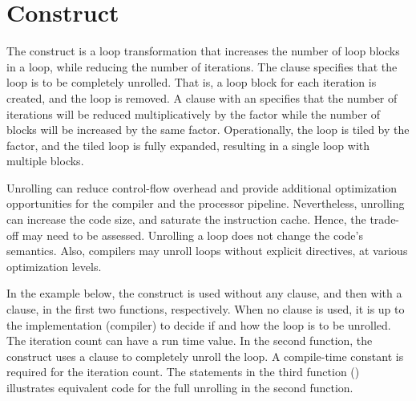 \pagebreak
\section{ Construct}
\label{sec:unroll}

The  construct is a loop transformation that increases the 
number of loop blocks in a loop, while reducing the number of iterations.
The  clause specifies that the loop is to be completely unrolled.  
That is, a loop block for each iteration is created, and the loop is removed.
A  clause  with an  specifies that the number of
iterations will be reduced multiplicatively by the factor while the number of 
blocks will be increased by the same factor.  
Operationally, the loop is tiled by the factor, and the tiled loop is 
fully expanded, resulting in a single loop with multiple blocks.

Unrolling can reduce control-flow overhead and provide additional
optimization opportunities for the compiler and the processor
pipeline. Nevertheless, unrolling can increase the code size, and saturate
the instruction cache. Hence, the trade-off may need to be assessed.
Unrolling a loop does not change the code's semantics. Also, compilers
may unroll loops without explicit directives, at various optimization levels.

In the example below, the  construct is used without any clause, and then
with a  clause, in the first two functions, respectively.
When no clause is used, it is up to the implementation (compiler) 
to decide if and how the loop is to be unrolled.  
The iteration count can have a run time value.  
In the second function, the  construct uses a  clause
to completely unroll the loop.  A compile-time constant is required for the iteration count.
The statements in the third function () illustrates
equivalent code for the full unrolling in the second function.



